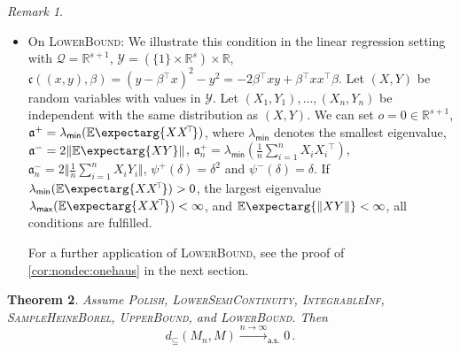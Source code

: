 \documentclass{scrartcl}
\renewcommand{\subset}{\subseteq}
\newcommand{\Ex}{\E\expectarg}
\newcommand*{\mc}[1]{\mathcal{#1}}
\newcommand*{\ms}[1]{\mathsf{#1}}
\newcommand*{\mf}[1]{\mathfrak{#1}}
\newcommand{\R}{\mathbb{R}}
\newcommand{\transpose}{\!^\top\!}
\newcommand{\tr}{\transpose}
\newcommand{\normof}[1]{\Vert #1 \Vert}
\newcommand{\equationFullstop}{\, .}
\newcommand{\eqfs}{\equationFullstop}
\theoremstyle{plain}\newtheorem{theorem}{Theorem}[section]
\theoremstyle{definition}
\theoremstyle{remark}
\newtheorem{remark}[theorem]{Remark}
\begin{document}
\begin{remark}
\begin{itemize}
\item On \textsc{LowerBound}:
	We illustrate this condition in the linear regression setting with $\mc Q = \R^{s+1}$, $\mc Y = (\{1\}\times\R^s) \times \R$, $\mf c((x,y),\beta) = (y - \beta\tr x)^2 - y^2 = - 2 \beta\tr x y + \beta\tr xx\tr \beta$. Let $(X, Y)$ be random variables with values in $\mc Y$. Let $(X_1, Y_1),\dots, (X_n, Y_n)$ be independent with the same distribution as $(X,Y)$. We can set $o = 0\in\R^{s+1}$, $\mf a^+ = \lambda_{\ms{min}}(\Ex{XX\tr})$, where $\lambda_{\ms{min}}$ denotes the smallest eigenvalue, $\mf a^- = 2 \normof{\Ex{XY}}$, $\mf a^+_n = \lambda_{\ms{min}}(\frac{1}n \sum_{i=1}^n X_iX_i\tr)$, $\mf a^-_n = 2 \normof{\frac{1}n\sum_{i=1}^n X_iY_i}$, $\psi^+(\delta) = \delta^2$ and $\psi^-(\delta) = \delta$. If $\lambda_{\ms{min}}(\Ex{XX\tr}) > 0$, the largest eigenvalue $\lambda_{\ms{max}}(\Ex{XX\tr}) < \infty$, and $\Ex{\normof{XY}} < \infty$, all conditions are fulfilled.

	For a further application of \textsc{LowerBound}, see the proof of \autoref{cor:nondec:onehaus} in the next section.
\end{itemize}
\end{remark}
\begin{theorem}\label{thm:consistency}
	Assume \textsc{Polish}, \textsc{LowerSemiContinuity}, \textsc{IntegrableInf},  \textsc{SampleHeineBorel}, \textsc{UpperBound}, and \textsc{LowerBound}. Then
	\begin{equation*}
		d_\subset(M_n, M) \xrightarrow{n\to\infty}_{\ms{a.s.}} 0
		\eqfs
	\end{equation*}
\end{theorem}
\end{document}
